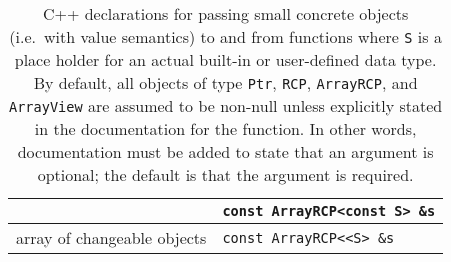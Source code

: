 \begin{table}[p]
\begin{center}
\begin{tabular}{|l|l|}
& {}\texttt{const ArrayRCP<const S> \&s} \\
\hline
array of changeable objects
& {}\texttt{const ArrayRCP<<S> \&s} \\
\hline
\end{tabular}
%
%
%
\end{center}
\caption{\label{fig:func_args_value_type}
C++ declarations for passing small concrete objects (i.e.\ with value
semantics) to and from functions where {}\texttt{S} is a place holder for an
actual built-in or user-defined data type.  By default, all objects of type
{}\texttt{Ptr}, {}\texttt{RCP}, {}\texttt{ArrayRCP}, and {}\texttt{ArrayView}
are assumed to be non-null unless explicitly stated in the documentation for
the function.  In other words, documentation must be added to state that an
argument is optional; the default is that the argument is required.}
%
\end{table}


